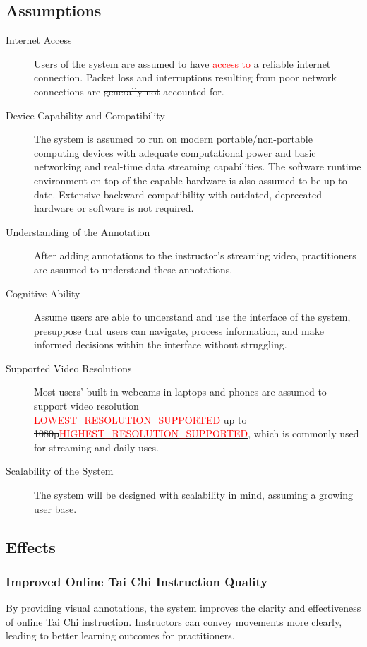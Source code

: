 \documentclass[12pt]{article}
\begin{document}
\subsection{Assumptions}
\begin{description}
    \item[Internet Access] Users of the system are assumed to have \textcolor{red}{access to }a \sout{reliable} internet connection. Packet loss and interruptions resulting from poor network connections are \sout{generally not} accounted for.
    \item[Device Capability and Compatibility] The system is assumed to run on modern portable/non-portable computing devices with adequate computational power and basic networking and real-time data streaming capabilities. The software runtime environment on top of the capable hardware is also assumed to be up-to-date. Extensive backward compatibility with outdated, deprecated hardware or software is not required.
    \item[Understanding of the Annotation] After adding annotations to the instructor’s streaming video, practitioners are assumed to understand these annotations.
    \item[Cognitive Ability] Assume users are able to understand and use the interface of the system, presuppose that users can navigate, process information, and make informed decisions within the interface without struggling.
    \item[Supported Video Resolutions] Most users’ built-in webcams in laptops and phones are assumed to support video resolution\\ \hyperref[sec:symbolic-constants]{\textcolor{red}{LOWEST\_RESOLUTION\_SUPPORTED}} \sout{up} to \\\sout{1080p}\hyperref[sec:symbolic-constants]{\textcolor{red}{HIGHEST\_RESOLUTION\_SUPPORTED}}, which is commonly used for streaming and daily uses.
    \item[Scalability of the System] The system will be designed with scalability in mind, assuming a growing user base.
\end{description}

\subsection{Effects}
\subsubsection{Improved Online Tai Chi Instruction Quality}
By providing visual annotations, the system improves the clarity and effectiveness of online Tai Chi instruction. Instructors can convey movements more clearly, leading to better learning outcomes for practitioners.
\end{document}

